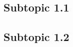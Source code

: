 \documentclass{article}
\begin{document}
\subsection{Subtopic 1.1}
\lipsum[3-4]

\subsection{Subtopic 1.2}
\lipsum[5-6]
\end{document}
